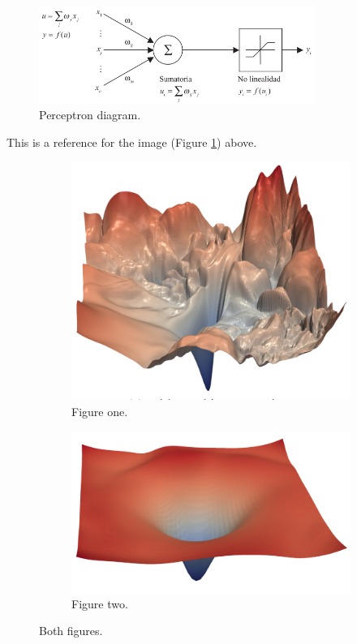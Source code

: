 \documentclass{article} %
\begin{document}
\begin{figure}[H]
    \centering
    \includegraphics[width=0.8\textwidth]{images/perceptron-graph}
    \caption{Perceptron diagram.}
    \label{fig:perceptron-graph}
\end{figure}

This is a reference for the image (Figure \ref{fig:perceptron-graph}) above.

\begin{figure}[H]
    \centering
    \begin{subfigure}{2in}
        \includegraphics[width=1\textwidth]{images/mse-visu-1}
        \caption{Figure one.}
        \label{fig:mse-visu-1}
    \end{subfigure}    
    \begin{subfigure}{2in}
        \includegraphics[width=1\textwidth]{images/mse-visu-2}
        \caption{Figure two.}
        \label{fig:mse-visu-2}
    \end{subfigure}
    \caption{Both figures.}
    \label{fig:mse-visu-12}
\end{figure}
\end{document}

